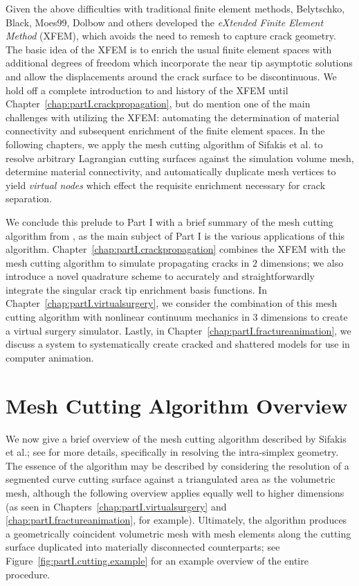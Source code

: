 Given the above difficulties with traditional finite element methods, Belytschko, Black, Moes99, Dolbow \cite{Belytschko99, Moes99} and others developed the \emph{eXtended Finite Element Method} (XFEM), which avoids the need to remesh to capture crack geometry. The basic idea of the XFEM is to enrich the usual finite element spaces with additional degrees of freedom which incorporate the near tip asymptotic solutions and allow the displacements around the crack surface to be discontinuous. We hold off a complete introduction to and history of the XFEM until Chapter~\ref{chap:partI.crackpropagation}, but do mention one of the main challenges with utilizing the XFEM: automating the determination of material connectivity and subsequent enrichment of the finite element spaces. In the following chapters, we apply the mesh cutting algorithm of Sifakis et al. \cite{Sifakis07} to resolve arbitrary Lagrangian cutting surfaces against the simulation volume mesh, determine material connectivity, and automatically duplicate mesh vertices to yield \emph{virtual nodes} which effect the requisite enrichment necessary for crack separation.

We conclude this prelude to Part I with a brief summary of the mesh cutting algorithm from \cite{Sifakis07}, as the main subject of Part I is the various applications of this algorithm. Chapter~\ref{chap:partI.crackpropagation} combines the XFEM with the mesh cutting algorithm to simulate propagating cracks in $2$ dimensions; we also introduce a novel quadrature scheme to accurately and straightforwardly integrate the singular crack tip enrichment basis functions. In Chapter~\ref{chap:partI.virtualsurgery}, we consider the combination of this mesh cutting algorithm with nonlinear continuum mechanics in $3$ dimensions to create a virtual surgery simulator. Lastly, in Chapter~\ref{chap:partI.fractureanimation}, we discuss a system to systematically create cracked and shattered models for use in computer animation.

\section*{Mesh Cutting Algorithm Overview}

We now give a brief overview of the mesh cutting algorithm described by Sifakis et al.; see \cite{Sifakis07} for more details, specifically in resolving the intra-simplex geometry. The essence of the algorithm may be described by considering the resolution of a segmented curve cutting surface against a triangulated area as the volumetric mesh, although the following overview applies equally well to higher dimensions (as seen in Chapters~\ref{chap:partI.virtualsurgery} and \ref{chap:partI.fractureanimation}, for example). Ultimately, the algorithm produces a geometrically coincident volumetric mesh with mesh elements along the cutting surface duplicated into materially disconnected counterparts; see Figure~\ref{fig:partI.cutting.example} for an example overview of the entire procedure.

